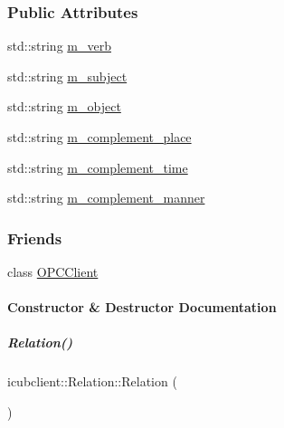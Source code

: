 \subsubsection*{Public Attributes}
\begin{DoxyCompactItemize}
\item 
std\+::string \hyperlink{group__icubclient__representations_ad918c1a79c53ff302803e3369c899a48}{m\+\_\+verb}
\item 
std\+::string \hyperlink{group__icubclient__representations_a17aa3a13fa0d96fef36e4e9ca9a79545}{m\+\_\+subject}
\item 
std\+::string \hyperlink{group__icubclient__representations_a45b344b5e1330bb8f987566179545289}{m\+\_\+object}
\item 
std\+::string \hyperlink{group__icubclient__representations_aaa98e6911d76f87fc93a2d3e3a44b8ac}{m\+\_\+complement\+\_\+place}
\item 
std\+::string \hyperlink{group__icubclient__representations_a3993e492f949767d75f113df9d96a8bf}{m\+\_\+complement\+\_\+time}
\item 
std\+::string \hyperlink{group__icubclient__representations_adf280bb23fd4bda8deb840fcf57a5f6f}{m\+\_\+complement\+\_\+manner}
\end{DoxyCompactItemize}
\subsubsection*{Friends}
\begin{DoxyCompactItemize}
\item 
class \hyperlink{group__icubclient__representations_a80f0caa9925206967111a3d2713874a2}{O\+P\+C\+Client}
\end{DoxyCompactItemize}


\paragraph{Constructor \& Destructor Documentation}
\mbox{\label{group__icubclient__representations_ad534358d219c6bd37103261b8c73ca28}} 
\subparagraph{\texorpdfstring{Relation()}{Relation()}\hspace{0.1cm}{\footnotesize\ttfamily [1/4]}}
{\footnotesize\ttfamily icubclient\+::\+Relation\+::\+Relation (\begin{DoxyParamCaption}{ }\end{DoxyParamCaption})\hspace{0.3cm}{\ttfamily [inline]}}



